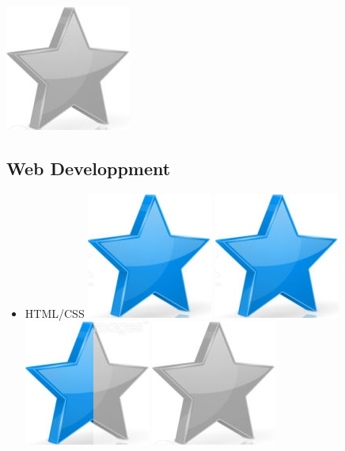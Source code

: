 \documentclass[10pt,a4paper,sans]{article}
\begin{document}
\begin{minipage}[t]{0.28\textwidth}
\begin{mdframed}[style=cadreCompetences]
\begin{itemize}
{                    \includegraphics[scale=0.25]{img/empty_star.png}}
            \end{itemize}
        \subsection{Web Developpment}
            \begin{itemize}
                \item{HTML/CSS
                    \hfill
                    \includegraphics[scale=0.25]{img/star.png} \hspace{-0.22cm}
                    \includegraphics[scale=0.25]{img/star.png} \hspace{-0.22cm}
                    \includegraphics[scale=0.25]{img/half_star.png} \hspace{-0.22cm}
                    \includegraphics[scale=0.25]{img/empty_star.png} \hspace{-0.22cm}
}
\end{itemize}
\end{mdframed}
\end{minipage}
\end{document}
